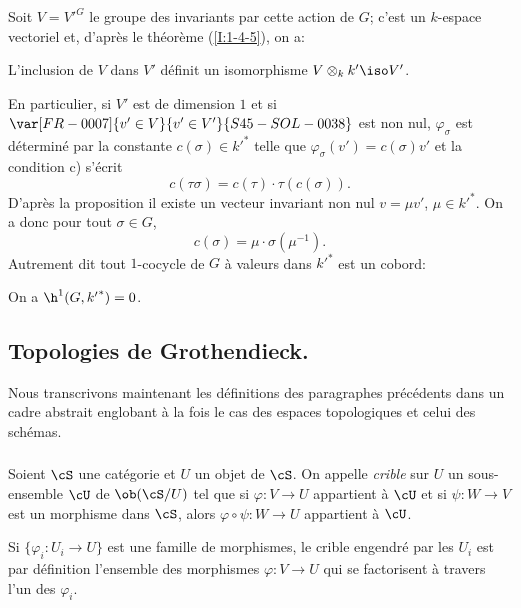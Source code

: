 Soit $V={V'}^G$ le groupe des invariants par cette action de $G$; c'est un 
$k$-espace vectoriel et, d'après le théorème (\ref{I:1-4-5}), on a:

\begin{propositiondotdash}\label{I:1-5-2}
L'inclusion de $V$ dans $V'$ définit un isomorphisme 
$V\otimes_k k' \iso V'$.
\end{propositiondotdash}

En particulier, si $V'$ est de dimension $1$ et si $\var[FR-0007]{v'\in V}{v'\in V'}{S45-SOL-0038}$ est non nul, 
$\varphi_\sigma$ est déterminé par la constante 
$c(\sigma)\in {k'}^*$ telle que $\varphi_\sigma(v')=c(\sigma)v'$ et la 
condition c) s'écrit 
\[
  c(\tau\sigma) = c(\tau)\cdot \tau(c(\sigma))\text{.}
\]
D'après la proposition il existe un vecteur invariant non nul 
$v=\mu v'$, $\mu\in {k'}^*$. On a donc pour tout $\sigma\in G$, 
\[
  c(\sigma) = \mu\cdot \sigma(\mu^{-1})\text{.}
\]
Autrement dit tout $1$-cocycle de $G$ à valeurs dans ${k'}^*$ est un 
cobord: 

\begin{corollarydash}\label{I:1-5-3}
On a $\h^1(G,{k'}^*)=0$.
\end{corollarydash}










\subsection{Topologies de Grothendieck.}\label{I:1-6}

Nous transcrivons maintenant les définitions des paragraphes précédents 
dans un cadre abstrait englobant à la fois le cas des espaces topologiques 
et celui des schémas. 





\subsubsection{}\label{I:1-6-1}

Soient $\cS$ une catégorie et $U$ un objet de $\cS$. On appelle \emph{crible} 
sur $U$ un sous-ensemble $\cU$ de $\ob(\cS/U)$ tel que si $\varphi:V\to U$ 
appartient à $\cU$ et si $\psi:W\to V$ est un morphisme dans $\cS$, alors 
$\varphi\circ\psi:W\to U$ appartient à $\cU$. 

Si $\{\varphi_i:U_i\to U\}$ est une famille de morphismes, le crible 
engendré par les $U_i$ est par définition l'ensemble des morphismes 
$\varphi:V\to U$ qui se factorisent à travers l'un des $\varphi_i$. 


